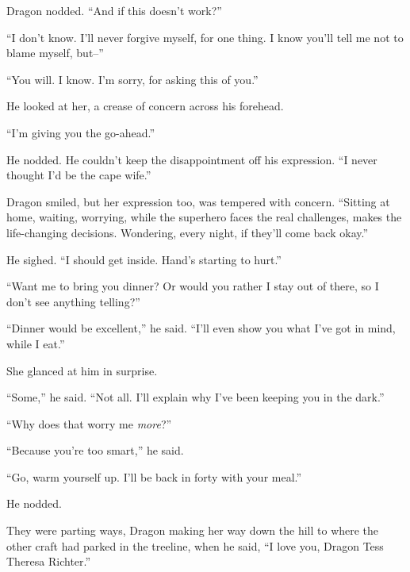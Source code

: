Dragon nodded.  ``And if this doesn't work?''



``I don't know.  I'll never forgive myself, for one thing.  I know you'll tell me not to blame myself, but--''



``You will.  I know.  I'm sorry, for asking this of you.''



He looked at her, a crease of concern across his forehead.



``I'm giving you the go-ahead.''



He nodded.  He couldn't keep the disappointment off his expression.  ``I never thought I'd be the cape wife.''



Dragon smiled, but her expression too, was tempered with concern.  ``Sitting at home, waiting, worrying, while the superhero faces the real challenges, makes the life-changing decisions.  Wondering, every night, if they'll come back okay.''



He sighed.  ``I should get inside.  Hand's starting to hurt.''



``Want me to bring you dinner?  Or would you rather I stay out of there, so I don't see anything telling?''



``Dinner would be excellent,'' he said.  ``I'll even show you what I've got in mind, while I eat.''



She glanced at him in surprise.



``Some,'' he said.  ``Not all.  I'll explain why I've been keeping you in the dark.''



``Why does that worry me \emph{more}?''



``Because you're too smart,'' he said.



``Go, warm yourself up.  I'll be back in forty with your meal.''



He nodded.



They were parting ways, Dragon making her way down the hill to where the other craft had parked in the treeline, when he said, ``I love you, Dragon Tess Theresa Richter.''



